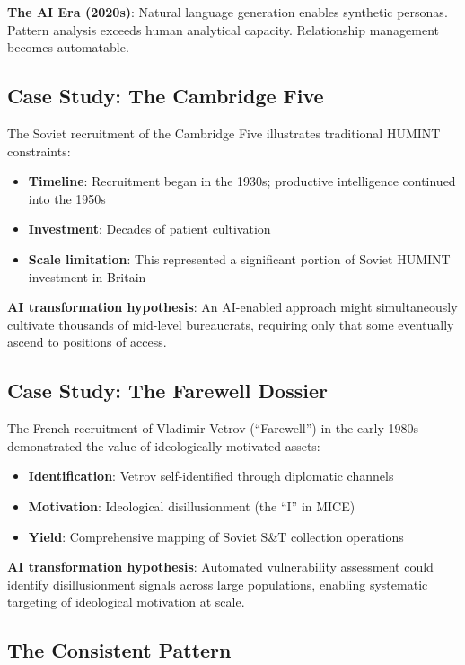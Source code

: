 \documentclass[11pt,letterpaper]{article}
\begin{document}
\textbf{The AI Era (2020s)}: Natural language generation enables synthetic personas. Pattern analysis exceeds human analytical capacity. Relationship management becomes automatable.

\subsection{Case Study: The Cambridge Five}

The Soviet recruitment of the Cambridge Five illustrates traditional HUMINT constraints:
\begin{itemize}
  \item \textbf{Timeline}: Recruitment began in the 1930s; productive intelligence continued into the 1950s
  \item \textbf{Investment}: Decades of patient cultivation
  \item \textbf{Scale limitation}: This represented a significant portion of Soviet HUMINT investment in Britain
\end{itemize}

\textbf{AI transformation hypothesis}: An AI-enabled approach might simultaneously cultivate thousands of mid-level bureaucrats, requiring only that some eventually ascend to positions of access.

\subsection{Case Study: The Farewell Dossier}

The French recruitment of Vladimir Vetrov (``Farewell'') in the early 1980s demonstrated the value of ideologically motivated assets:

\begin{itemize}
  \item \textbf{Identification}: Vetrov self-identified through diplomatic channels
  \item \textbf{Motivation}: Ideological disillusionment (the ``I'' in MICE)
  \item \textbf{Yield}: Comprehensive mapping of Soviet S\&T collection operations
\end{itemize}

\textbf{AI transformation hypothesis}: Automated vulnerability assessment could identify disillusionment signals across large populations, enabling systematic targeting of ideological motivation at scale.

\subsection{The Consistent Pattern}
\end{document}
